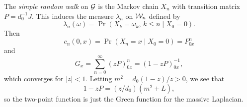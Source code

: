 
The \emph{simple random walk} on
$\mathcal{G}$ is the Markov chain $X_n$ with transition matrix $P = d_0^{-1} J$. This induces
the measure $\lambda_n$ on $\mathcal{W}_n$ defined by
\begin{equation}
\lambda_n(\omega) = \Pr(X_k = \omega_k, \, k \le n \mid X_0 = 0).
\end{equation}
Then
\begin{equation}
c_n(0, x) = \Pr(X_n = x \mid X_0 = 0) = P^n_{0x}
\end{equation}
and
\begin{equation}
G_x = \sum_{n=0}^\infty (z P)^n_{0x} = (1 - z P)^{-1}_{0x},
\end{equation}
which converges for $|z| < 1$.
Letting $m^2 = d_0 (1 - z) / z > 0$, we see that
\begin{equation}
1 - z P = (z / d_0) (m^2 + L),
\end{equation}
so the two-point function is just the Green function for the massive Laplacian.

\vspace{3cm}

